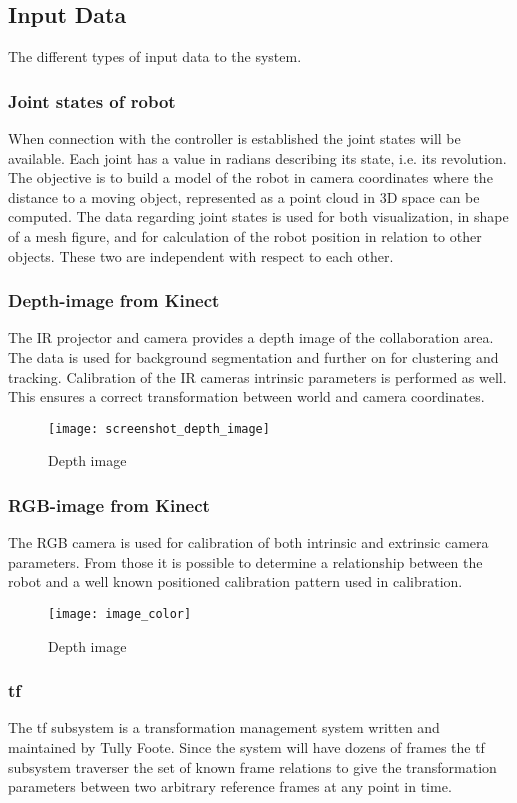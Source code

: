 \subsection{Input Data}
The different types of input data to the system.
\subsubsection{Joint states of robot}
When connection with the controller is established the joint states will be available. Each joint has a value in radians describing its state, i.e. its revolution. The objective is to build a model of the robot in camera coordinates where the distance to a moving object, represented as a point cloud in 3D space can be computed.
The data regarding joint states is used for both visualization, in shape of a mesh figure, and for calculation of the robot position in relation to other objects. These two are independent with respect to each other.

\subsubsection{Depth-image from Kinect}
The IR projector and camera provides a depth image of the collaboration area. The data is used for background segmentation and further on for clustering and tracking. Calibration of the IR cameras intrinsic parameters is performed as well. This ensures a correct transformation between world and camera coordinates.

\begin{figure}[H]
\begin{center}
\texttt{[image: screenshot\_depth\_image]}
\caption{Depth image}
\label{tracking}
\end{center}
\end{figure}

\subsubsection{RGB-image from Kinect}
The RGB camera is used for calibration of both intrinsic and extrinsic camera parameters. From those it is possible to determine a relationship between the robot and a well known positioned calibration pattern used in calibration. 

\begin{figure}[H]
\begin{center}
\texttt{[image: image\_color]}
\caption{Depth image}
\label{tracking}
\end{center}
\end{figure}

\subsubsection{tf}
The tf subsystem is a transformation management system written and maintained by Tully Foote. Since the system will have dozens of frames the tf subsystem traverser the set of known frame relations to give the transformation parameters between two arbitrary reference frames at any point in time. 
